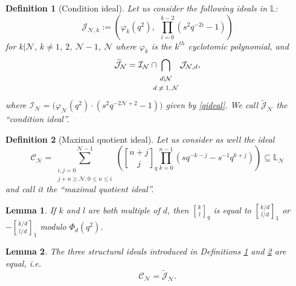 \documentclass[10pt,a4paper]{amsart}
\newtheorem{defn}{Definition}
\newtheorem{lem}{Lemma}
\newcommand{\Liq}{\mathbb L}
\newcommand{\cC}{\mathcal{C}}
\newcommand{\cI}{\mathcal{I}}
\newcommand{\cJ}{\mathcal{J}}
\newcommand{\cN}{\mathcal{N}}
\renewcommand{\geq}{\geqslant}
\renewcommand{\leq}{\leqslant}
\begin{document}
\begin{defn}[Condition ideal] 
\label{def:condition} 
Let us consider the following ideals in $\Liq$: 
%
%
\begin{equation*}
\cJ_{\cN,k}:=\left( \varphi_k(q^2),\  \ \prod_{i=0}^{k-2}(s^2q^{-2i}-1) \right)
\end{equation*}
for $k| \cN$, $k \neq 1$, $2$, $\cN-1$, $\cN$ where $\varphi_k$ is the $k^{th}$ cyclotomic polynomial, and
\begin{equation*}
\widetilde{\cJ}_\cN = \cI_\cN \cap\!\!\!\! \bigcap_{\text{\scriptsize$\begin{matrix}
d | \cN\\[-1pt]
d\neq 1, \cN
\end{matrix}$}} \cJ_{\cN,d},  
\end{equation*}
where $\cI_\cN = \Big( \varphi_\cN(q^2)\cdot (s^2q^{-2\cN+2}-1) \Big)$ given by \eqref{qideal}.  
We call $\widetilde{\cJ}_\cN$ the ``condition ideal''.
\end{defn}

\begin{defn}[Maximal quotient ideal]
\label{def:maximal}
Let us consider as well the ideal
\begin{equation}\label{idealb}
\cC_\cN = \sum_{\substack{i,j=0 \\ j+n\geq \cN,0\leq  n\leq i}}^{\cN-1}
 \left( {n+j \brack j}_q \prod_{k=0}^{n-1}(sq^{-k-j}-s^{-1}q^{k+j}) \right) \subseteq \Liq_{\cN}
\end{equation}
and call it the ``maximal quotient ideal''.
\end{defn}

\begin{lem}\label{lem:qi}
If $k$ and $l$ are both multiple of $d$, then ${k \brack l}_q$
is equal to ${k/d \brack l/d}_1$ or $-{k/d \brack l/d}_1$ modulo $\Phi_d(q^2)$.  
\end{lem}

\begin{lem}
\label{lem:EQ3}
The   three  structural ideals introduced in Definitions \ref{def:condition} and \ref{def:maximal} are equal, i.e. 
\begin{equation*}
\cC_\cN = \widetilde{\cJ}_{\cN}. 
\end{equation*}
\end{lem}
\end{document}
